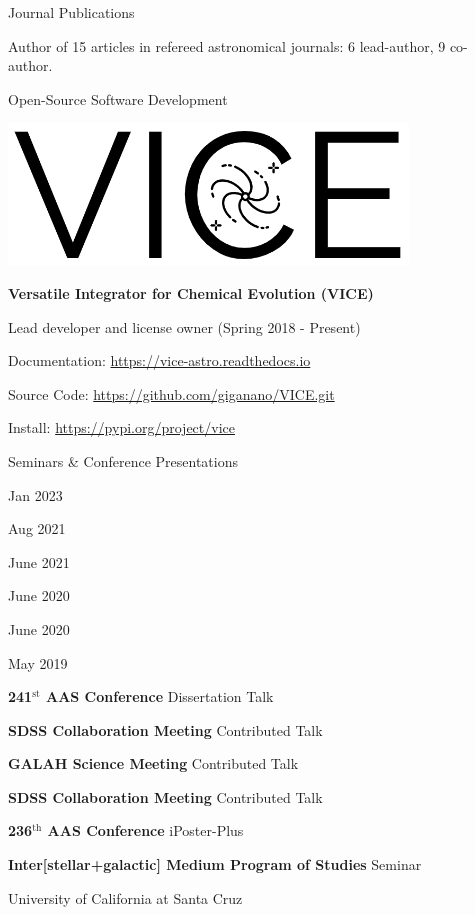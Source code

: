 \documentclass[cv.tex]{subfiles}
\begin{document}
{\color{themecolor} \large Journal Publications}
\par\noindent
Author of 15 articles in refereed astronomical journals: 6 lead-author,
9 co-author.
\par\noindent
{}

\par\null\par\noindent
{%
{\color{themecolor}\large Open-Source Software Development}
\par\noindent
\parbox{0.35\textwidth}{%
	\centering
	\includegraphics[scale = 0.33]{vice-logo.png}
}
\parbox{0.63\textwidth}{%
	\textbf{Versatile Integrator for Chemical Evolution (VICE)} \par
	Lead developer and license owner (Spring 2018 - Present) \par
	Documentation: \url{https://vice-astro.readthedocs.io} \par
	Source Code: \url{https://github.com/giganano/VICE.git} \par
	Install: \url{https://pypi.org/project/vice}
}
}

\newpage
\noindent
{\color{themecolor} \large Seminars \& Conference Presentations}
\par\noindent
\parbox{0.18\textwidth}{%
	\raggedleft
	Jan 2023 \par
	Aug 2021 \par
	June 2021 \par
	June 2020 \par
	June 2020 \par
	May 2019 \par
	\null
}
\hspace{1mm}
\parbox{0.76\textwidth}{%
	\textbf{241$^\text{st}$ AAS Conference} \hfill Dissertation Talk \par
	\textbf{SDSS Collaboration Meeting} \hfill Contributed Talk \par
	\textbf{GALAH Science Meeting} \hfill Contributed Talk \par
	\textbf{SDSS Collaboration Meeting} \hfill Contributed Talk \par
	\textbf{236$^\text{th}$ AAS Conference} \hfill iPoster-Plus \par
	\textbf{Inter[stellar+galactic] Medium Program of Studies} \hfill Seminar
	\par
	University of California at Santa Cruz
}
\end{document}
